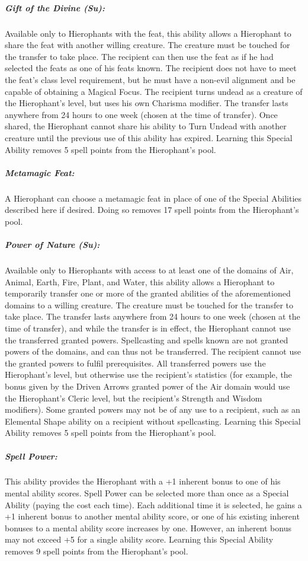 \subparagraph{Gift of the Divine (Su):}
Available only to Hierophants with the  feat, this ability allows a Hierophant to share the feat with another willing creature.
The creature must be touched for the transfer to take place.
The recipient can then use the feat as if he had selected the feats as one of his feats known.
The recipient does not have to meet the feat's class level requirement, but he must have a non-evil alignment and be capable of obtaining a Magical Focus.
The recipient turns undead as a creature of the Hierophant's level, but uses his own Charisma modifier.
The transfer lasts anywhere from 24 hours to one week (chosen at the time of transfer). 
Once shared, the Hierophant cannot share his ability to Turn Undead with another creature until the previous use of this ability has expired.
Learning this Special Ability removes 5 spell points from the Hierophant's pool.

\subparagraph{Metamagic Feat:}
A Hierophant can choose a metamagic feat in place of one of the Special Abilities described here if desired.
Doing so removes 17 spell points from the Hierophant's pool.

\subparagraph{Power of Nature (Su):}
Available only to Hierophants with access to at least one of the domains of Air, Animal, Earth, Fire, Plant, and Water, this ability allows a Hierophant to temporarily transfer one or more of the granted abilities of the aforementioned domains to a willing creature. 
The creature must be touched for the transfer to take place.
The transfer lasts anywhere from 24 hours to one week (chosen at the time of transfer), and while the transfer is in effect, the Hierophant cannot use the transferred granted powers.
Spellcasting and spells known are not granted powers of the domains, and can thus not be transferred.
The recipient cannot use the granted powers to fulfil prerequisites.
All transferred powers use the Hierophant's level, but otherwise use the recipient's statistics (for example, the bonus given by the Driven Arrows granted power of the Air domain would use the Hierophant's Cleric level, but the recipient's Strength and Wisdom modifiers).
Some granted powers may not be of any use to a recipient, such as an Elemental Shape ability on a recipient without spellcasting.
Learning this Special Ability removes 5 spell points from the Hierophant's pool.

\subparagraph{Spell Power:}
This ability provides the Hierophant with a +1 inherent bonus to one of his mental ability scores. 
Spell Power can be selected more than once as a Special Ability (paying the cost each time). 
Each additional time it is selected, he gains a +1 inherent bonus to another mental ability score, or one of his existing inherent bonuses to a mental ability score increases by one.
However, an inherent bonus may not exceed +5 for a single ability score.
Learning this Special Ability removes 9 spell points from the Hierophant's pool.

